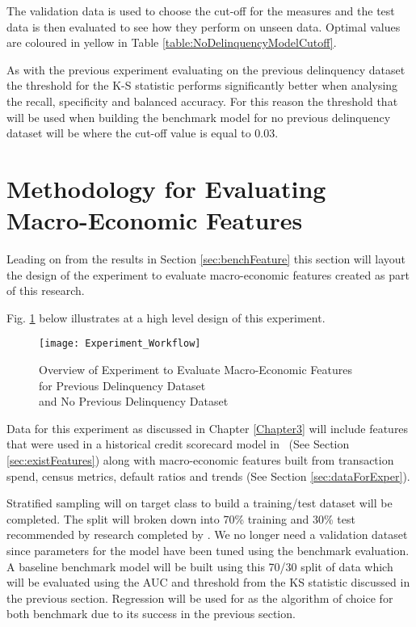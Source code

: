The validation data is used to choose the cut-off for the measures and the test data is then evaluated to see how they perform on unseen data. Optimal values are coloured in yellow in Table \ref{table:NoDelinquencyModelCutoff}.

As with the previous experiment evaluating on the previous delinquency dataset the threshold for the K-S statistic performs significantly better when analysing the recall, specificity and balanced accuracy. For this reason  the threshold that will be used when building the benchmark model for no previous delinquency dataset will be where the cut-off value is equal to 0.03.

\section{Methodology for Evaluating Macro-Economic Features}
Leading on from the results in Section \ref{sec:benchFeature} this section will layout the design of the experiment to evaluate macro-economic features created as part of this research. 
 
Fig. \ref{fig:Experiment_Workflow} below illustrates at a high level design of this experiment. 

\begin{figure}[H]
	\texttt{[image: Experiment\_Workflow]}
	\caption{Overview of Experiment to Evaluate Macro-Economic Features \\
		for Previous Delinquency Dataset \\
		and No Previous Delinquency Dataset}
	\label{fig:Experiment_Workflow}
\end{figure}


Data for this experiment as discussed in Chapter \ref{Chapter3} will include features that were used in a historical credit scorecard model in \subjectname\ (See Section \ref{sec:existFeatures}) along with macro-economic features built from transaction spend, census metrics, default ratios and trends (See Section \ref{sec:dataForExper}). 

Stratified sampling will on target class to build a training/test dataset will be completed. The split will broken down into 70\% training and 30\% test recommended by research completed by \cite{siddiqi_credit_2012}. We no longer need a validation dataset since parameters for the model have been tuned using the benchmark evaluation. A baseline benchmark model will be built using this 70/30 split of data which will be evaluated using the AUC and threshold from the KS statistic discussed in the previous section. Regression will be used for as the algorithm of choice for both benchmark due to its success in the previous section.

